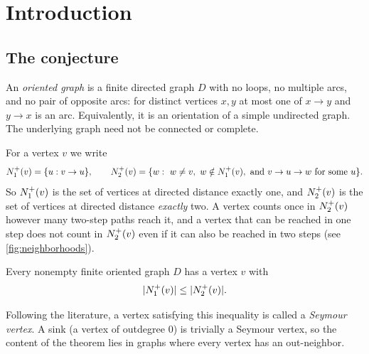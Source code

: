 \section{Introduction}\label{sec:intro}

\subsection{The conjecture}

An \emph{oriented graph} is a finite directed graph $D$ with no loops, no
multiple arcs, and no pair of opposite arcs: for distinct vertices $x,y$ at
most one of $x\to y$ and $y\to x$ is an arc. Equivalently, it is an
orientation of a simple undirected graph. The underlying graph need not be
connected or complete.

For a vertex $v$ we write
\[
 N^+_1(v)=\{u: v\to u\},\qquad
 N^+_2(v)=\{w:\ w\ne v,\ w\notin N^+_1(v),\ \text{and } v\to u\to w \text{ for some } u\}.
\]
So $N^+_1(v)$ is the set of vertices at directed distance exactly one, and
$N^+_2(v)$ is the set of vertices at directed distance \emph{exactly} two.
A vertex counts once in $N^+_2(v)$ however many two-step paths reach it,
and a vertex that can be reached in one step does not count in $N^+_2(v)$
even if it can also be reached in two steps (see \cref{fig:neighborhoods}).

\begin{theorem}\label{thm:main}
Every nonempty finite oriented graph $D$ has a vertex $v$ with
\[
 \lvert N^+_1(v)\rvert\le\lvert N^+_2(v)\rvert.
\]
\end{theorem}

Following the literature, a vertex satisfying this inequality is called a
\emph{Seymour vertex}. A sink (a vertex of outdegree $0$) is trivially a
Seymour vertex, so the content of the theorem lies in graphs where every
vertex has an out-neighbor.

